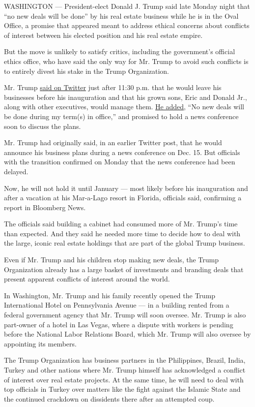 WASHINGTON --- President-elect Donald J. Trump said late Monday night
that ``no new deals will be done'' by his real estate business while he
is in the Oval Office, a promise that appeared meant to address ethical
concerns about conflicts of interest between his elected position and
his real estate empire.

But the move is unlikely to satisfy critics, including the government's
official ethics office, who have said the only way for Mr. Trump to
avoid such conflicts is to entirely divest his stake in the Trump
Organization.

Mr. Trump
\href{https://twitter.com/realDonaldTrump/status/808528428123254785}{said
on Twitter} just after 11:30 p.m. that he would leave his businesses
before his inauguration and that his grown sons, Eric and Donald Jr.,
along with other executives, would manage them.
\href{https://twitter.com/realDonaldTrump/status/808529888630239232}{He
added}, ``No new deals will be done during my term(s) in office,'' and
promised to hold a news conference soon to discuss the plans.

Mr. Trump had originally said, in an earlier Twitter post, that he would
announce his business plans during a news conference on Dec. 15. But
officials with the transition confirmed on Monday that the news
conference had been delayed.

Now, he will not hold it until January --- most likely before his
inauguration and after a vacation at his Mar-a-Lago resort in Florida,
officials said, confirming a report in Bloomberg News.

The officials said building a cabinet had consumed more of Mr. Trump's
time than expected. And they said he needed more time to decide how to
deal with the large, iconic real estate holdings that are part of the
global Trump business.

Even if Mr. Trump and his children stop making new deals, the Trump
Organization already has a large basket of investments and branding
deals that present apparent conflicts of interest around the world.

In Washington, Mr. Trump and his family recently opened the Trump
International Hotel on Pennsylvania Avenue --- in a building rented from
a federal government agency that Mr. Trump will soon oversee. Mr. Trump
is also part-owner of a hotel in Las Vegas, where a dispute with workers
is pending before the National Labor Relations Board, which Mr. Trump
will also oversee by appointing its members.

The Trump Organization has business partners in the Philippines, Brazil,
India, Turkey and other nations where Mr. Trump himself has acknowledged
a conflict of interest over real estate projects. At the same time, he
will need to deal with top officials in Turkey over matters like the
fight against the Islamic State and the continued crackdown on
dissidents there after an attempted coup.

